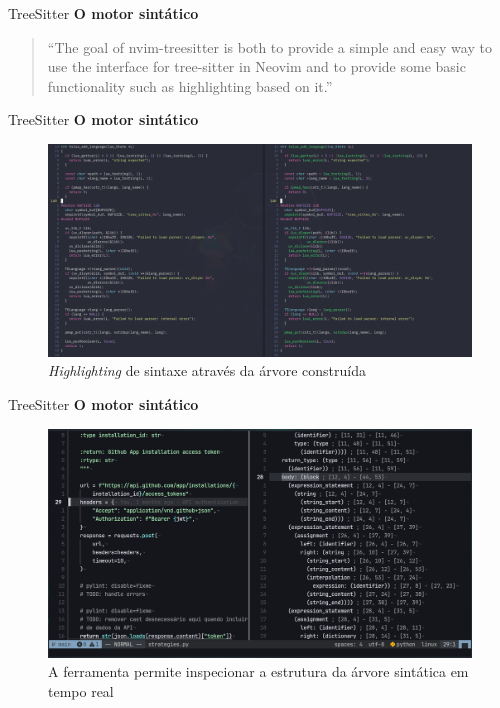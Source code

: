 \begin{frame}{TreeSitter}
  \textbf{O motor sintático}
    \begin{quotation} \small
      ``The goal of nvim-treesitter is both to provide a simple and easy way to use the interface for tree-sitter in
      Neovim and to provide some basic functionality such as highlighting based on it.''
    \end{quotation}
\end{frame}

\begin{frame}{TreeSitter}
  \textbf{O motor sintático}
  \begin{figure}
      \centering
      \includegraphics[height=0.5\linewidth]{Image/TreeSitter-Highlighting-Comparison.png}
      \label{treesitter-syntax-highlighting}
      \footnotesize
      \\ \textit{Highlighting} de sintaxe através da árvore construída\\
  \end{figure}
\end{frame}

\begin{frame}{TreeSitter}
  \textbf{O motor sintático}
  \begin{figure}
      \centering
      \includegraphics[height=0.5\linewidth]{Image/InspectTree.png}
      \label{treesitter-inspect-tree}
      \footnotesize
      \\ A ferramenta permite inspecionar a estrutura da árvore sintática em tempo real \\
  \end{figure}
\end{frame}

